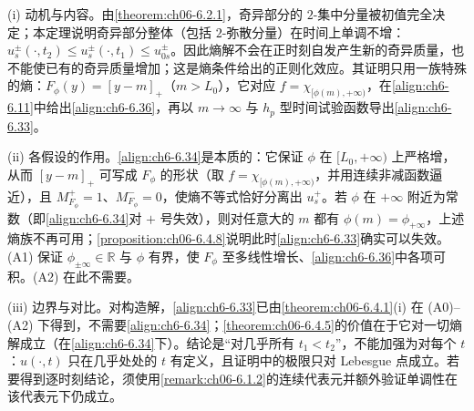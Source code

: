 \documentclass[../../main.tex]{subfiles}%
\begin{document}
\begin{remark}\label{remark:ch06-正则动机}
(i) 动机与内容。由\cref{theorem:ch06-6.2.1}，奇异部分的 $2$-集中分量被初值完全决定；本定理说明奇异部分整体（包括 $2$-弥散分量）在时间上单调不增：$u^\pm_s(\cdot,t_2)\leqslant u^\pm_s(\cdot,t_1)\leqslant u^\pm_{0s}$。因此熵解不会在正时刻自发产生新的奇异质量，也不能使已有的奇异质量增加；这是熵条件给出的正则化效应。其证明只用一族特殊的熵：$F_\phi(y)=[y-m]_+$（$m>L_0$），它对应 $f=\chi_{[\phi(m),+\infty)}$，在\eqref{align:ch6-6.11}中给出\eqref{align:ch6-6.36}，再以 $m\to\infty$ 与 $h_p$ 型时间试验函数导出\eqref{align:ch6-6.33}。

(ii) 各假设的作用。\eqref{align:ch6-6.34}是本质的：它保证 $\phi$ 在 $[L_0,+\infty)$ 上严格增，从而 $[y-m]_+$ 可写成 $F_\phi$ 的形状（取 $f=\chi_{[\phi(m),+\infty)}$，并用连续非减函数逼近），且 $M^+_{F_\phi}=1$、$M^-_{F_\phi}=0$，使熵不等式恰好分离出 $u^+_s$。若 $\phi$ 在 $+\infty$ 附近为常数（即\eqref{align:ch6-6.34}对 $+$ 号失效），则对任意大的 $m$ 都有 $\phi(m)=\phi_{+\infty}$，上述熵族不再可用；\cref{proposition:ch06-6.4.8}说明此时\eqref{align:ch6-6.33}确实可以失效。(A1) 保证 $\phi_{\pm\infty}\in\mathbb{R}$ 与 $\phi$ 有界，使 $F_\phi$ 至多线性增长、\eqref{align:ch6-6.36}中各项可积。(A2) 在此不需要。

(iii) 边界与对比。对构造解，\eqref{align:ch6-6.33}已由\cref{theorem:ch06-6.4.1}(i) 在 (A0)--(A2) 下得到，不需要\eqref{align:ch6-6.34}；\cref{theorem:ch06-6.4.5}的价值在于它对一切熵解成立（在\eqref{align:ch6-6.34}下）。结论是“对几乎所有 $t_1<t_2$”，不能加强为对每个 $t$：$u(\cdot,t)$ 只在几乎处处的 $t$ 有定义，且证明中的极限只对 Lebesgue 点成立。若要得到逐时刻结论，须使用\cref{remark:ch06-6.1.2}的连续代表元并额外验证单调性在该代表元下仍成立。
\end{remark}
\end{document}
